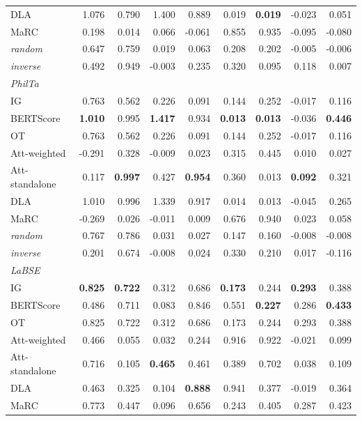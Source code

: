 \begin{table}[t]
\begin{tabular}{lrrrrrrrr}
DLA & 1.076 & 0.790 & 1.400 & 0.889 & 0.019 & \textbf{0.019} & -0.023 & 0.051 \\
MaRC & 0.198 & 0.014 & 0.066 & -0.061 & 0.855 & 0.935 & -0.095 & -0.080 \\
\textit{random} & 0.647 & 0.759 & 0.019 & 0.063 & 0.208 & 0.202 & -0.005 & -0.006 \\
\textit{inverse} & 0.492 & 0.949 & -0.003 & 0.235 & 0.320 & 0.095 & 0.118 & 0.007 \\
\midrule
\multicolumn{9}{l}{\textit{PhilTa}} \\
IG & 0.763 & 0.562 & 0.226 & 0.091 & 0.144 & 0.252 & -0.017 & 0.116 \\
BERTScore & \textbf{1.010} & 0.995 & \textbf{1.417} & 0.934 & \textbf{0.013} & \textbf{0.013} & -0.036 & \textbf{0.446} \\
OT & 0.763 & 0.562 & 0.226 & 0.091 & 0.144 & 0.252 & -0.017 & 0.116 \\
Att-weighted & -0.291 & 0.328 & -0.009 & 0.023 & 0.315 & 0.445 & 0.010 & 0.027 \\
Att-standalone & 0.117 & \textbf{0.997} & 0.427 & \textbf{0.954} & 0.360 & 0.013 & \textbf{0.092} & 0.321 \\
DLA & 1.010 & 0.996 & 1.339 & 0.917 & 0.014 & 0.013 & -0.045 & 0.265 \\
MaRC & -0.269 & 0.026 & -0.011 & 0.009 & 0.676 & 0.940 & 0.023 & 0.058 \\
\textit{random} & 0.767 & 0.786 & 0.031 & 0.027 & 0.147 & 0.160 & -0.008 & -0.008 \\
\textit{inverse} & 0.201 & 0.674 & -0.008 & 0.024 & 0.330 & 0.210 & 0.017 & -0.116 \\
\midrule
\multicolumn{9}{l}{\textit{LaBSE}} \\
IG & \textbf{0.825} & \textbf{0.722} & 0.312 & 0.686 & \textbf{0.173} & 0.244 & \textbf{0.293} & 0.388 \\
BERTScore & 0.486 & 0.711 & 0.083 & 0.846 & 0.551 & \textbf{0.227} & 0.286 & \textbf{0.433} \\
OT & 0.825 & 0.722 & 0.312 & 0.686 & 0.173 & 0.244 & 0.293 & 0.388 \\
Att-weighted & 0.466 & 0.055 & 0.032 & 0.244 & 0.916 & 0.922 & -0.021 & 0.099 \\
Att-standalone & 0.716 & 0.105 & \textbf{0.465} & 0.461 & 0.389 & 0.702 & 0.038 & 0.109 \\
DLA & 0.463 & 0.325 & 0.104 & \textbf{0.888} & 0.941 & 0.377 & -0.019 & 0.364 \\
MaRC & 0.773 & 0.447 & 0.096 & 0.656 & 0.243 & 0.405 & 0.287 & 0.423 \\

\end{tabular}
\end{table}

